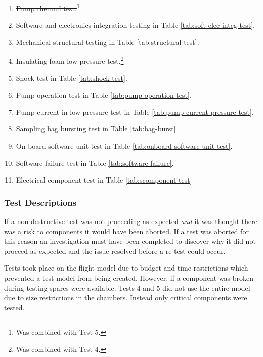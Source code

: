 \begin{enumerate}
    \item \st{Pump thermal test.}\footnote{Was combined with Test 5.\label{fn:test-combined5}}
    \item Software and electronics integration testing in Table \ref{tab:soft-elec-integ-test}.
    \item Mechanical structural testing in Table \ref{tab:structural-test}.
    \item \st{Insulating foam low pressure test.}\footnote{Was combined with Test 4.\label{fn:test-combined4}}
    \item Shock test in Table \ref{tab:shock-test}.
    \item Pump operation test in Table \ref{tab:pump-operation-test}.
    \item Pump current in low pressure test in Table \ref{tab:pump-current-pressure-test}.
    \item Sampling bag bursting test in Table \ref{tab:bag-burst}.
    \item On-board software unit test in Table \ref{tab:onboard-software-unit-test}.
    \item Software failure test in Table \ref{tab:software-failure}.
    \item Electrical component test in Table \ref{tab:scomponent-test}
\end{enumerate}

\subsubsection{Test Descriptions}

If a non-destructive test was not proceeding as expected \textit{and} it was thought there was a risk to components it would have been aborted. If a test was aborted for this reason an investigation must have been completed to discover why it did not proceed as expected and the issue resolved before a re-test could occur.

Tests took place on the flight model due to budget and time restrictions which prevented a test model from being created. However, if a component was broken during testing spares were available. Tests 4 and 5 did not use the entire model due to size restrictions in the chambers. Instead only critical components were tested.


